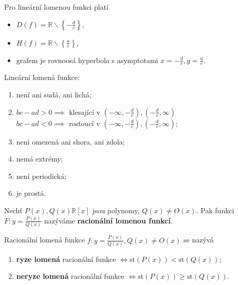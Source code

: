 \begin{pozn}
  Pro lineární lomenou funkci platí
  \begin{itemize}
      \item $D(f)=\mathbb R \smallsetminus \left \{ -\frac{d}{c} \right \},$
    	\item $H(f)=\mathbb R \smallsetminus \left \{ \frac{a}{c} \right \},$
     	\item grafem je rovnoosá hyperbola s asymptotami
      $x=-\frac{d}{c}, y=\frac{a}{c}.$
  \end{itemize}
\end{pozn}

\begin{veta}
    Lineární lomená funkce:
    \begin{enumerate}[$i.$]
        \item není ani sudá, ani lichá;
       	\item $bc-ad > 0 \implies$ klesající v
        $\left ( -\infty, -\frac{d}{c} \right ),
        \left ( -\frac{d}{c}, \infty \right ) $ \\
        $bc-ad < 0 \implies$ rostoucí v
        $\left ( -\infty, -\frac{d}{c} \right ),
        \left ( -\frac{d}{c}, \infty \right ) $;
       	\item není omezená ani shora, ani zdola;
       	\item nemá extrémy;
       	\item není periodická;
       	\item je prostá.
    \end{enumerate}
\end{veta}

\begin{definition}
    Nechť $P(x), Q(x) \mathbb R[x]$ jsou polynomy, $Q(x) \ne O(x).$
    Pak funkci $F:y=\frac{P(x)}{Q(x)}$ nazýváme \textbf{racionální
    lomenou funkcí}.
\end{definition}

\begin{definition}
    Racionální lomená funkce $f: y=\frac{P(x)}{Q(x)}, Q(x) \ne O(x)$
    se nazývá
    \begin{enumerate}[$i.$]
        \item \textbf{ryze lomená} racionální funkce
        $\iff \text{st}\left (P(x) \right ) <
        \text{st}\left (Q(x) \right )$;
       	\item \textbf{neryze lomená} racionální funkce
        $\iff \text{st}\left (P(x) \right ) \geq
        \text{st}\left (Q(x) \right )$.
    \end{enumerate}
\end{definition}

